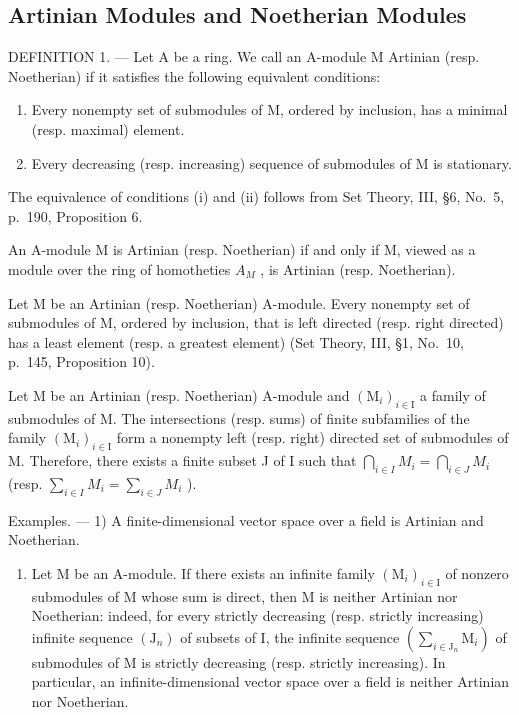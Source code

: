 \subsection{Artinian Modules and Noetherian Modules}

DEFINITION 1. --- Let A be a ring. We call an A-module M Artinian (resp. Noetherian) if it satisfies the following equivalent conditions:

\begin{enumerate}
\def\labelenumi{(\roman{enumi})}
\item
  Every nonempty set of submodules of M, ordered by inclusion, has a minimal (resp. maximal) element.
\item
  Every decreasing (resp. increasing) sequence of submodules of M is stationary.
\end{enumerate}

The equivalence of conditions (i) and (ii) follows from Set Theory, III, §6, No.~5, p.~190, Proposition 6.

An A-module M is Artinian (resp. Noetherian) if and only if M, viewed as a module over the ring of homotheties \(A_{M}\) , is Artinian (resp. Noetherian).

Let M be an Artinian (resp. Noetherian) A-module. Every nonempty set of submodules of M, ordered by inclusion, that is left directed (resp. right directed) has a least element (resp. a greatest element) (Set Theory, III, §1, No.~10, p.~145, Proposition 10).

Let M be an Artinian (resp. Noetherian) A-module and \((\mathrm{M}_{i})_{i\in\mathrm{I}}\) a family of submodules of M. The intersections (resp. sums) of finite subfamilies of the family \((\mathrm{M}_{i})_{i\in\mathrm{I}}\) form a nonempty left (resp. right) directed set of submodules of M. Therefore, there exists a finite subset J of I such that \(\bigcap_{i\in I}M_{i}=\bigcap_{i\in J}M_{i}\) (resp. \(\sum_{i\in I}M_{i}=\sum_{i\in J}M_{i}\) ).

Examples. --- 1) A finite-dimensional vector space over a field is Artinian and Noetherian.

\begin{enumerate}
\def\labelenumi{\arabic{enumi})}
\setcounter{enumi}{1}
\tightlist
\item
  Let M be an A-module. If there exists an infinite family \((\mathrm{M}_{i})_{i\in\mathrm{I}}\) of nonzero submodules of M whose sum is direct, then M is neither Artinian nor Noetherian: indeed, for every strictly decreasing (resp. strictly increasing) infinite sequence \((\mathrm{J}_{n})\) of subsets of I, the infinite sequence \((\sum_{i\in\mathrm{J}_{n}}\mathrm{M}_{i})\) of submodules of M is strictly decreasing (resp. strictly increasing). In particular, an infinite-dimensional vector space over a field is neither Artinian nor Noetherian.
\end{enumerate}

